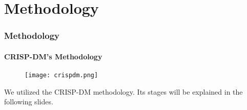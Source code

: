 \begin{frame}
\begin{thebibliography}{99}
		

		
		 
		
 
		
		

		
		
		
		
		\normalsize		 

	\end{thebibliography}

	
	
\end{frame}
\section{Methodology}

\begin{frame}
	\frametitle{Methodology}
	\framesubtitle{CRISP-DM's Methodology}	
	\begin{figure}
		\texttt{[image: crispdm.png]}
	\end{figure}

	\begin{block}{}
	\scriptsize
		We utilized the CRISP-DM methodology. Its stages will be explained in the following slides.	
	\end{block}	
\end{frame}

